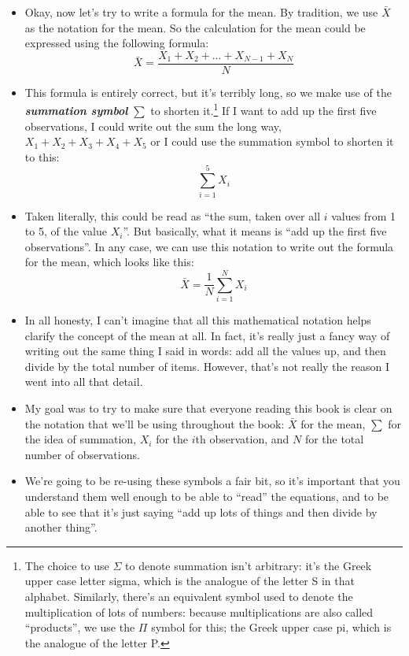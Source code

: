 \documentclass[
]{book}
\begin{document}
\begin{itemize}
\item
  Okay, now let's try to write a formula for the mean. By tradition, we use \(\bar{X}\) as the notation for the mean. So the calculation for the mean could be expressed using the following formula:
  \[
  \bar{X} = \frac{X_1 + X_2 + ... + X_{N-1} + X_N}{N}
  \]
\item
  This formula is entirely correct, but it's terribly long, so we make use of the \textbf{\emph{summation symbol}} \(\scriptstyle\sum\) to shorten it.\footnote{The choice to use \(\Sigma\) to denote summation isn't arbitrary: it's the Greek upper case letter sigma, which is the analogue of the letter S in that alphabet. Similarly, there's an equivalent symbol used to denote the multiplication of lots of numbers: because multiplications are also called ``products'', we use the \(\Pi\) symbol for this; the Greek upper case pi, which is the analogue of the letter P.} If I want to add up the first five observations, I could write out the sum the long way, \(X_1 + X_2 + X_3 + X_4 +X_5\) or I could use the summation symbol to shorten it to this:
  \[
  \sum_{i=1}^5 X_i
  \]
\item
  Taken literally, this could be read as ``the sum, taken over all \(i\) values from 1 to 5, of the value \(X_i\)''. But basically, what it means is ``add up the first five observations''. In any case, we can use this notation to write out the formula for the mean, which looks like this:
  \[
  \bar{X} = \frac{1}{N} \sum_{i=1}^N X_i 
  \]
\item
  In all honesty, I can't imagine that all this mathematical notation helps clarify the concept of the mean at all. In fact, it's really just a fancy way of writing out the same thing I said in words: add all the values up, and then divide by the total number of items. However, that's not really the reason I went into all that detail.
\item
  My goal was to try to make sure that everyone reading this book is clear on the notation that we'll be using throughout the book: \(\bar{X}\) for the mean, \(\scriptstyle\sum\) for the idea of summation, \(X_i\) for the \(i\)th observation, and \(N\) for the total number of observations.
\item
  We're going to be re-using these symbols a fair bit, so it's important that you understand them well enough to be able to ``read'' the equations, and to be able to see that it's just saying ``add up lots of things and then divide by another thing''.
\end{itemize}
\end{document}
